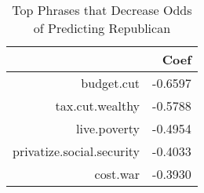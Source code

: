 \begin{table}[ht]
\centering
\begin{tabular}{rr}
  \hline
 & Coef \\ 
  \hline
budget.cut & -0.6597 \\ 
  tax.cut.wealthy & -0.5788 \\ 
  live.poverty & -0.4954 \\ 
  privatize.social.security & -0.4033 \\ 
  cost.war & -0.3930 \\ 
   \hline
\end{tabular}
\caption{Top Phrases that Decrease Odds of Predicting Republican} 
\label{tab:repx_coef_n}
\end{table}
